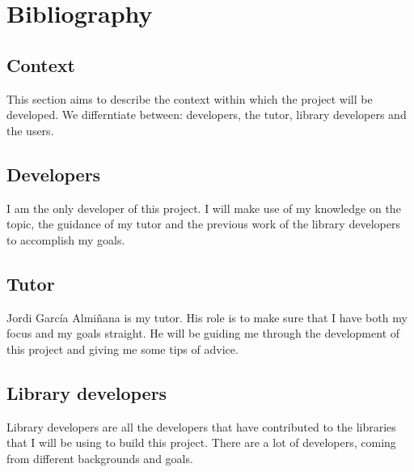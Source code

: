 %
%
%

\section{Bibliography}

\subsection{Context}

This section aims to describe the context within which the project will be
developed. We differntiate between: developers, the tutor, library developers
and the users.

\subsection{Developers}

I am the only developer of this project. I will make use of my knowledge on the
topic, the guidance of my tutor and the previous work of the library developers
to accomplish my goals.

\subsection{Tutor}

Jordi García Almiñana is my tutor. His role is to make sure that I
have both my focus and my goals straight. He will be guiding me through the
development of this project and giving me some tips of advice.

\subsection{Library developers}

Library developers are all the developers that have contributed to the
libraries that I will be using to build this project. There are a lot of
developers, coming from different backgrounds and goals.

